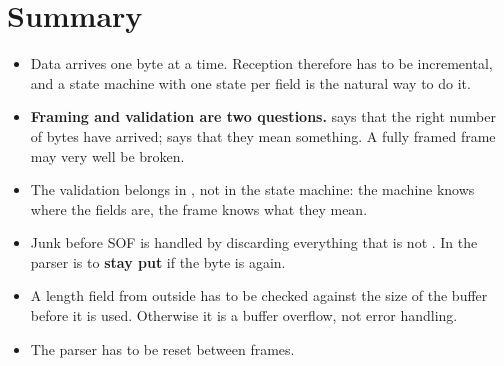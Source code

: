\section*{Summary}

\begin{itemize}
  \item Data arrives one byte at a time. Reception therefore has to be incremental, and a state
    machine with one state per field is the natural way to do it.
  \item \textbf{Framing and validation are two questions.}  says that the
    right number of bytes have arrived;  says that they mean something. A
    fully framed frame may very well be broken.
  \item The validation belongs in , not in the state machine: the
    machine knows where the fields are, the frame knows what they mean.
  \item Junk before SOF is handled by  discarding everything that is not
    . In  the parser is to \textbf{stay put} if the byte is
     again.
  \item A length field from outside has to be checked against the size of the buffer before it is
    used. Otherwise it is a buffer overflow, not error handling.
  \item The parser has to be reset between frames.
\end{itemize}
